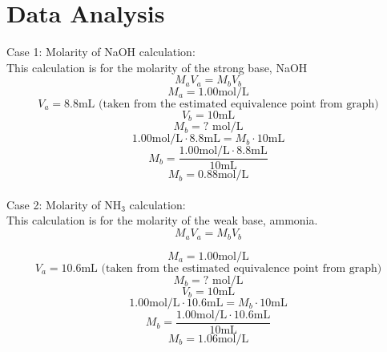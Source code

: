 \documentclass[10pt, letterpaper]{article}
\begin{document}
\begin{sidewaysfigure}[ht]
\end{sidewaysfigure}

\begin{sidewaysfigure}[ht]
\end{sidewaysfigure}


\section{Data Analysis}
Case 1: Molarity of NaOH calculation:
\\
This calculation is for the molarity of the strong base, NaOH
\begin{equation}
M_{a}V_{a}=M_{b}V_{b}
\end{equation}
$$M_{a}=1.00 \text{mol/L}$$
$$V_{a}=8.8 \text{mL (taken from the estimated equivalence point from graph)}$$
$$V_{b}=10 \text{mL}$$
$$M_{b}=?\text{ mol/L}$$
$$1.00\text{mol/L}\cdot8.8\text{mL}=M_{b}\cdot10\text{mL}$$
$$M_{b}=\frac{1.00\text{mol/L}\cdot8.8\text{mL}}{10\text{mL}}$$
$$M_{b}=0.88\text{mol/L}$$
\\
Case 2: Molarity of NH$_{3}$ calculation:
\\
This calculation is for the molarity of the weak base, ammonia.
\begin{equation}
M_{a}V_{a}=M_{b}V_{b}
\end{equation}

$$M_{a}=1.00 \text{mol/L}$$
$$V_{a}=10.6 \text{mL (taken from the estimated equivalence point from graph)}$$
$$M_{b}=?\text{ mol/L}$$
$$V_{b}=10 \text{mL}$$
$$1.00\text{mol/L}\cdot10.6\text{mL}=M_{b}\cdot10\text{mL}$$
$$M_{b}=\frac{1.00\text{mol/L}\cdot10.6\text{mL}}{10\text{mL}}$$
$$M_{b}=1.06\text{mol/L}$$
\end{document}
